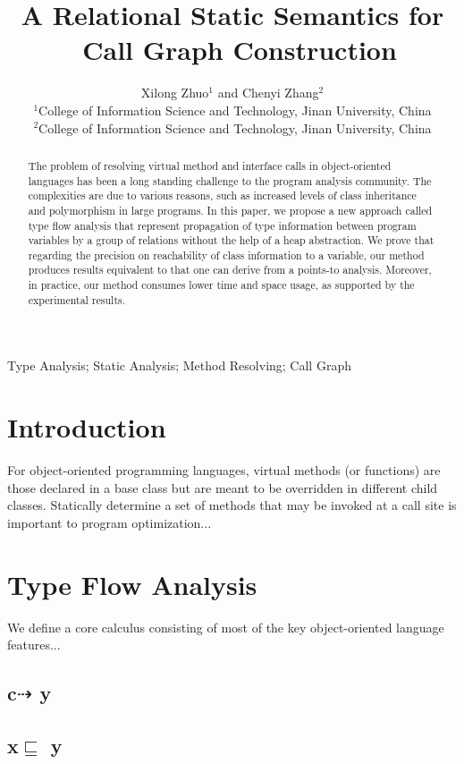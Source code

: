 \documentclass{fac}
\title{A Relational Static Semantics for\\
		\ Call Graph Construction}
\author[Xilong Zhuo and Chenyi Zhang]
    {Xilong Zhuo$^1$ and Chenyi Zhang$^2$\\
     $^1$College of Information Science and Technology, Jinan University, China\\
     $^2$College of Information Science and Technology, Jinan University, China}
\newcommand{\less}{\sqsubseteq}
\newcommand{\tflow}{\dashrightarrow}
\begin{document}
\label{firstpage}

\makecorrespond

\maketitle

\begin{abstract}
The problem of resolving virtual method and interface calls in object-oriented languages has been a long standing challenge to the program analysis community. The complexities are due to various reasons, such as increased levels of class inheritance and polymorphism in large programs. In this paper, we propose a new approach called type flow analysis that represent propagation of type information between program variables by a group of relations without the help of a heap abstraction. We prove that regarding the precision on reachability of class information to a variable, our method produces results equivalent to that one can derive from a points-to analysis. Moreover, in practice, our method consumes lower time and space usage, as supported by the experimental results.
\end{abstract}

\begin{keywords}
Type Analysis; Static Analysis; Method Resolving; Call Graph
\end{keywords}

\section{Introduction}

For object-oriented programming languages, virtual methods (or functions) are those declared in a base class but are meant to be overridden in different child classes. Statically determine a set of methods that may be invoked at a call site is important to program optimization...
\section{Type Flow Analysis}\label{sec:type-flow-analysis}
We define a core calculus consisting of most of the key object-oriented language features...
\subsection{c$\tflow$ y}
\subsection{x$\less$ y}
\end{document}
